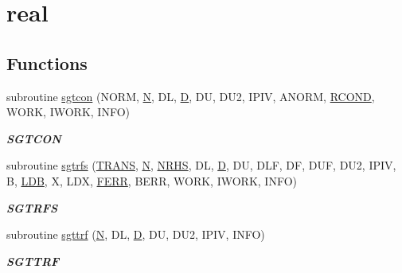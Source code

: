 \hypertarget{group__realGTcomputational}{}\section{real}
\label{group__realGTcomputational}
\subsection*{Functions}
\begin{DoxyCompactItemize}
\item 
subroutine \hyperlink{group__realGTcomputational_ga9474585c30f5420fc243d0bd0e0e9c12}{sgtcon} (N\+O\+R\+M, \hyperlink{polmisc_8c_a0240ac851181b84ac374872dc5434ee4}{N}, D\+L, \hyperlink{odrpack_8h_a7dae6ea403d00f3687f24a874e67d139}{D}, D\+U, D\+U2, I\+P\+I\+V, A\+N\+O\+R\+M, \hyperlink{superlu__enum__consts_8h_af00a42ecad444bbda75cde1b64bd7e72a9b5c151728d8512307565994c89919d5}{R\+C\+O\+N\+D}, W\+O\+R\+K, I\+W\+O\+R\+K, I\+N\+F\+O)
\begin{DoxyCompactList}\small\item\em {\bfseries S\+G\+T\+C\+O\+N} \end{DoxyCompactList}\item 
subroutine \hyperlink{group__realGTcomputational_gaa83bbd4b0fcb6e3dffaa4ea7c08b2f08}{sgtrfs} (\hyperlink{superlu__enum__consts_8h_a0c4e17b2d5cea33f9991ccc6a6678d62a1f61e3015bfe0f0c2c3fda4c5a0cdf58}{T\+R\+A\+N\+S}, \hyperlink{polmisc_8c_a0240ac851181b84ac374872dc5434ee4}{N}, \hyperlink{example__user_8c_aa0138da002ce2a90360df2f521eb3198}{N\+R\+H\+S}, D\+L, \hyperlink{odrpack_8h_a7dae6ea403d00f3687f24a874e67d139}{D}, D\+U, D\+L\+F, D\+F, D\+U\+F, D\+U2, I\+P\+I\+V, B, \hyperlink{example__user_8c_a50e90a7104df172b5a89a06c47fcca04}{L\+D\+B}, X, L\+D\+X, \hyperlink{superlu__enum__consts_8h_af00a42ecad444bbda75cde1b64bd7e72a78fd14d7abebae04095cfbe02928f153}{F\+E\+R\+R}, B\+E\+R\+R, W\+O\+R\+K, I\+W\+O\+R\+K, I\+N\+F\+O)
\begin{DoxyCompactList}\small\item\em {\bfseries S\+G\+T\+R\+F\+S} \end{DoxyCompactList}\item 
subroutine \hyperlink{group__realGTcomputational_ga0cd464cdbfc79c87c6b3fa3d1e139abf}{sgttrf} (\hyperlink{polmisc_8c_a0240ac851181b84ac374872dc5434ee4}{N}, D\+L, \hyperlink{odrpack_8h_a7dae6ea403d00f3687f24a874e67d139}{D}, D\+U, D\+U2, I\+P\+I\+V, I\+N\+F\+O)
\begin{DoxyCompactList}\small\item\em {\bfseries S\+G\+T\+T\+R\+F} \end{DoxyCompactList}\item 

\end{DoxyCompactItemize}
